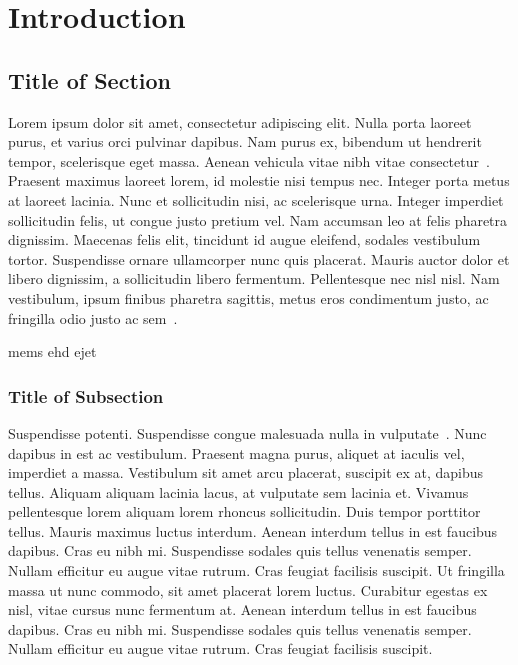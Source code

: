 
\chapter{Introduction}
\graphicspath{{Chapter_1/Vector/}{Chapter_1/}}

\lipsum[1-2]

\section{Title of Section}

Lorem ipsum dolor sit amet, consectetur adipiscing elit. Nulla porta laoreet purus, et varius orci pulvinar dapibus. Nam purus ex, bibendum ut hendrerit tempor, scelerisque eget massa. Aenean vehicula vitae nibh vitae consectetur~\cite{ErdelyiBook}. Praesent maximus laoreet lorem, id molestie nisi tempus nec. Integer porta metus at laoreet lacinia. Nunc et sollicitudin nisi, ac scelerisque urna. Integer imperdiet sollicitudin felis, ut congue justo pretium vel. Nam accumsan leo at felis pharetra dignissim. Maecenas felis elit, tincidunt id augue eleifend, sodales vestibulum tortor. Suspendisse ornare ullamcorper nunc quis placerat. Mauris auctor dolor et libero dignissim, a sollicitudin libero fermentum. Pellentesque nec nisl nisl. Nam vestibulum, ipsum finibus pharetra sagittis, metus eros condimentum justo, ac fringilla odio justo ac sem~\cite{ErdelyiBook,JakesBook,ExtonBook}.

\lipsum[2-3]
\acrfull{mems} \acrfull{ehd} \acrfull{ejet}

\subsection{Title of Subsection}
\lipsum[1]

Suspendisse potenti. Suspendisse congue malesuada nulla in vulputate~\cite{SrivastavaBook,PrudnikovBookv4}. Nunc dapibus in est ac vestibulum. Praesent magna purus, aliquet at iaculis vel, imperdiet a massa. Vestibulum sit amet arcu placerat, suscipit ex at, dapibus tellus. Aliquam aliquam lacinia lacus, at vulputate sem lacinia et. Vivamus pellentesque lorem aliquam lorem rhoncus sollicitudin. Duis tempor porttitor tellus. Mauris maximus luctus interdum\cite{LeeBook1998,RyzhikBook,HoytApr1947}. Aenean interdum tellus in est faucibus dapibus. Cras eu nibh mi. Suspendisse sodales quis tellus venenatis semper. Nullam efficitur eu augue vitae rutrum. Cras feugiat facilisis suscipit. Ut fringilla massa ut nunc commodo, sit amet placerat lorem luctus. Curabitur egestas ex nisl, vitae cursus nunc fermentum at. Aenean interdum tellus in est faucibus dapibus. Cras eu nibh mi. Suspendisse sodales quis tellus venenatis semper. Nullam efficitur eu augue vitae rutrum. Cras feugiat facilisis suscipit.

